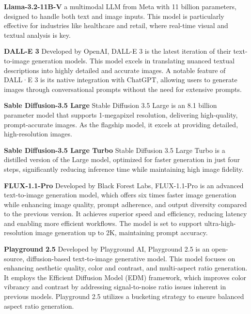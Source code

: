 \textbf{Llama-3.2-11B-V} \cite{meta2024llama3.2_11b} a multimodal LLM from Meta with 11 billion parameters, designed to handle both text and image inputs. This model is particularly effective for industries like healthcare and retail, where real-time visual and textual analysis is key.

\textbf{DALL-E 3} \cite{openai2023dalle3} Developed by OpenAI, DALL-E 3 is the latest iteration of their text-to-image generation models. This model excels in translating nuanced textual descriptions into highly detailed and accurate images. A notable feature of DALL·E 3 is its native integration with ChatGPT, allowing users to generate images through conversational prompts without the need for extensive prompts.

\textbf{Sable Diffusion-3.5 Large} \cite{stabilityai2024sd35} Stable Diffusion 3.5 Large is an 8.1 billion parameter model that supports 1-megapixel resolution, delivering high-quality, prompt-accurate images. As the flagship model, it excels at providing detailed, high-resolution images.

\textbf{Sable Diffusion-3.5 Large Turbo} \cite{stabilityai2024sd35} Stable Diffusion 3.5 Large Turbo is a distilled version of the Large model, optimized for faster generation in just four steps, significantly reducing inference time while maintaining high image fidelity.

\textbf{FLUX-1.1-Pro} \cite{blackforestlabs2024flux1.1pro} Developed by Black Forest Labs, FLUX-1.1-Pro is an advanced text-to-image generation model, which offers six times faster image generation while enhancing image quality, prompt adherence, and output diversity compared to the previous version. It achieves superior speed and efficiency, reducing latency and enabling more efficient workflows. The model is set to support ultra-high-resolution image generation up to 2K, maintaining prompt accuracy.

\textbf{Playground 2.5} \cite{playground2024v25} Developed by Playground AI, Playground 2.5 is an open-source, diffusion-based text-to-image generative model. This model focuses on enhancing aesthetic quality, color and contrast, and multi-aspect ratio generation. It employs the Efficient Diffusion Model (EDM) framework, which improves color vibrancy and contrast by addressing signal-to-noise ratio issues inherent in previous models. Playground 2.5 utilizes a bucketing strategy to ensure balanced aspect ratio generation.

